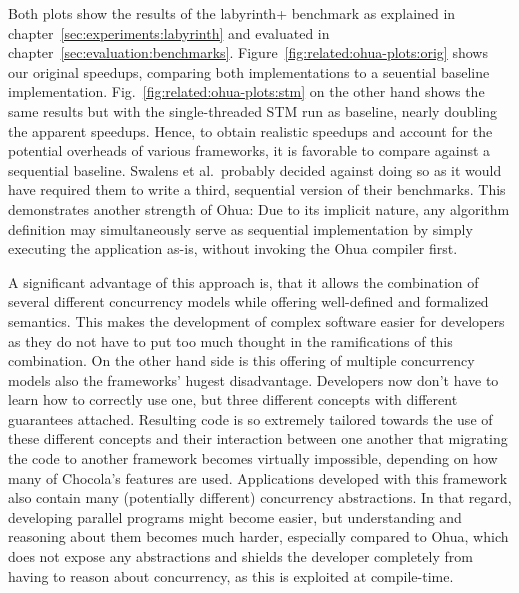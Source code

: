 Both plots show the results of the labyrinth+ benchmark as explained in chapter~\ref{sec:experiments:labyrinth} and evaluated in chapter~\ref{sec:evaluation:benchmarks}.
Figure~\ref{fig:related:ohua-plots:orig} shows our original speedups, comparing both implementations to a seuential baseline implementation.
Fig.~\ref{fig:related:ohua-plots:stm} on the other hand shows the same results but with the single-threaded STM run as baseline, nearly doubling the apparent speedups.
Hence, to obtain realistic speedups and account for the potential overheads of various frameworks, it is favorable to compare against a sequential baseline.
Swalens et al.\ probably decided against doing so as it would have required them to write a third, sequential version of their benchmarks.
This demonstrates another strength of Ohua: Due to its implicit nature, any algorithm definition may simultaneously serve as sequential implementation by simply executing the application as-is, without invoking the Ohua compiler first.

A significant advantage of this approach is, that it allows the combination of several different concurrency models while offering well-defined and formalized semantics.
This makes the development of complex software easier for developers as they do not have to put too much thought in the ramifications of this combination.
On the other hand side is this offering of multiple concurrency models also the frameworks' hugest disadvantage.
Developers now don't have to learn how to correctly use one, but three different concepts with different guarantees attached.
Resulting code is so extremely tailored towards the use of these different concepts and their interaction between one another that migrating the code to another framework becomes virtually impossible, depending on how many of Chocola's features are used.
Applications developed with this framework also contain many (potentially different) concurrency abstractions.
In that regard, developing parallel programs might become easier, but understanding and reasoning about them becomes much harder, especially compared to Ohua, which does not expose any abstractions and shields the developer completely from having to reason about concurrency, as this is exploited at compile-time.

